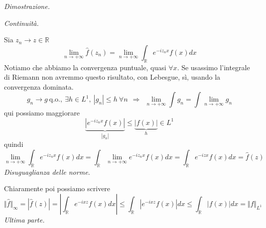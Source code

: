 \documentclass[10pt,a4paper,twoside]{book}
\begin{document}
\textit{Dimostrazione.}

\textit{Continuità.}

Sia $z_{n}\rightarrow z\in \mathbb{R}$
\begin{equation*}
\lim\limits _{n\rightarrow +\infty }\hat{f}( z_{n}) =\lim\limits _{n\rightarrow +\infty }\int _{\mathbb{R}} e^{-iz_{n} x} f( x) dx
\end{equation*}
Notiamo che abbiamo la convergenza puntuale, quasi $\forall x$. Se usassimo l'integrale di Riemann non avremmo questo risultato, con Lebesgue, sì, usando la convergenza dominata.
\begin{equation*}
g_{n}\rightarrow g\ \text{q.o.} ,\ \exists h\in L^{1} ,\ | g_{n}| \leqslant h\ \forall n\ \ \Rightarrow \ \ \lim\limits _{n\rightarrow +\infty }\int g_{n} =\int \lim\limits _{n\rightarrow +\infty } g_{n}
\end{equation*}
qui possiamo maggiorare
\begin{equation*}
\underbrace{\left| e^{-iz_{n} x} f( x)\right| }_{| g_{n}| } \leqslant \underbrace{| f( x)| }_{h} \in L^{1}
\end{equation*}
quindi
\begin{equation*}
\lim\limits _{n\rightarrow +\infty }\int _{\mathbb{R}} e^{-iz_{n} x} f( x) dx=\int _{\mathbb{R}}\lim\limits _{n\rightarrow +\infty } e^{-iz_{n} x} f( x) dx=\int _{\mathbb{R}} e^{-izx} f( x) dx=\hat{f}( z)
\end{equation*}
\textit{Disuguaglianza delle norme.}

Chiaramente poi possiamo scrivere
\begin{equation*}
\Vert \hat{f}\Vert _{\infty } =| \hat{f}( z)| =\left| \int _{\mathbb{R}} e^{-ixz} f( x) dx\right| \leqslant \int _{\mathbb{R}}\left| e^{-ixz} f( x)\right| dx\leqslant \int _{\mathbb{R}}| f( x)| dx=\Vert f\Vert _{L^{1}}
\end{equation*}
\textit{Ultima parte.}
\end{document}
